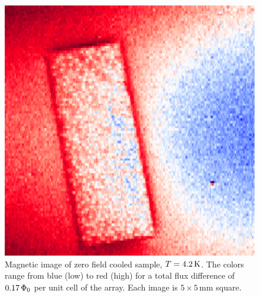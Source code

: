 \begin{figure}[p]
\includegraphics[width=5.7in]{figs/pme_exp/fig3_5_b_lg.ps}
\caption[Magnetic image of zero field cooled sample, $T=4.2\,\kelvin$.]{
Magnetic image of zero field cooled sample, $T=4.2\,\kelvin$.
The colors range from blue (low) to red (high) for 
a total flux difference of $0.17\,\Phi_0$ per unit cell of the
array. Each image is $5\times 5\,\mathrm{mm}$ square.}
\label{fig:pme_scanning_passes_b}
\end{figure}

